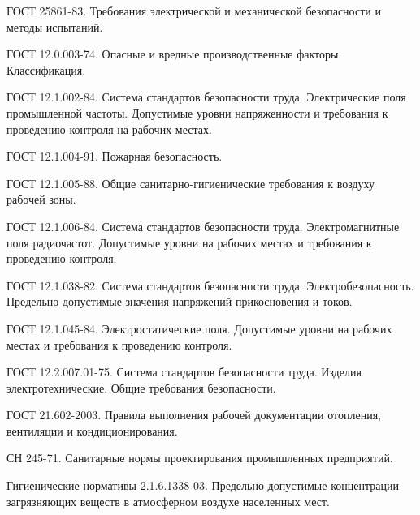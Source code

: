  ГОСТ 25861-83.
                                Требования электрической и механической
                                безопасности и методы испытаний.

   ГОСТ 12.0.003-74.
                                Опасные и вредные производственные факторы.
                                Классификация.

   ГОСТ 12.1.002-84.
                                Система стандартов безопасности труда.
                                Электрические поля промышленной частоты.
                                Допустимые уровни напряженности и требования
                                к проведению контроля на рабочих местах.

   ГОСТ 12.1.004-91.
                                Пожарная безопасность.

   ГОСТ 12.1.005-88.
                                Общие санитарно-гигиенические требования
                                к воздуху рабочей зоны.

   ГОСТ 12.1.006-84.
                                Система стандартов безопасности труда.
                                Электромагнитные поля радиочастот.
                                Допустимые уровни на рабочих местах и требования
                                к проведению контроля.

   ГОСТ 12.1.038-82.
                                Система стандартов безопасности труда.
                                Электробезопасность. Предельно допустимые
                                значения напряжений прикосновения и токов.

   ГОСТ 12.1.045-84.
                                Электростатические поля. Допустимые уровни на
                                рабочих местах и требования к проведению контроля.

    ГОСТ 12.2.007.01-75.
                                    Система стандартов безопасности труда.
                                    Изделия электротехнические.
                                    Общие требования безопасности.

  ГОСТ 21.602-2003.
                            Правила выполнения рабочей документации
                            отопления, вентиляции и кондиционирования.

   СН 245-71.
                                    Санитарные нормы проектирования промышленных
                                    предприятий.

  Гигиенические нормативы 2.1.6.1338-03.
                                        Предельно допустимые концентрации загрязняющих
                                        веществ в атмосферном воздухе населенных мест.
